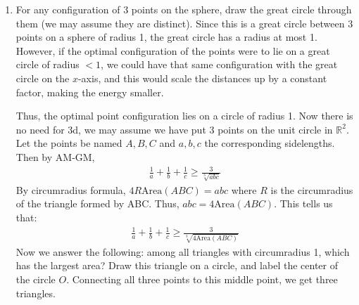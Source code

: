 \documentclass[12pt]{article}
\theoremstyle{definitionstyle}
\def\mbb#1{\mathbb{#1}}
\def\R{\mbb{R}}
\newcommand{\1}{\mathds 1}
\newcommand{\Area}{\mathrm{Area}}
\begin{document}
\begin{enumerate}
        \item For any configuration of 3 points on the sphere, draw the great circle through them (we may assume they are distinct). Since this is a great circle between 3 points on a sphere of radius 1, the great circle has a radius at most 1. However, if the optimal configuration of the points were to lie on a great circle of radius $<1$, we could have that same configuration with the great circle on the $x$-axis, and this would scale the distances up by a constant factor, making the energy smaller.

        Thus, the optimal point configuration lies on a circle of radius 1. Now there is no need for 3d, we may assume we have put 3 points on the unit circle in $\R^2$. Let the points be named $A,B,C$ and $a,b,c$ the corresponding sidelengths. Then by AM-GM,
        \begin{align*}
            \frac{1}a + \frac1b + \frac1c \geq \frac{3}{\sqrt[3]{abc}}
        \end{align*}
        By circumradius formula, $4R\Area(ABC) = abc$ where $R$ is the circumradius of the triangle formed by ABC. Thus, $abc = 4\Area(ABC)$. This tells us that:
        \begin{align*}
            \frac{1}a + \frac1b + \frac1c \geq \frac{3}{\sqrt[3]{4\Area(ABC)}}
        \end{align*}
        Now we answer the following: among all triangles with circumradius 1, which has the largest area? 
        Draw this triangle on a circle, and label the center of the circle $O$. Connecting all three points to this middle point, we get three triangles. 
        \begin{center}
\end{center}
\end{enumerate}
\end{document}

